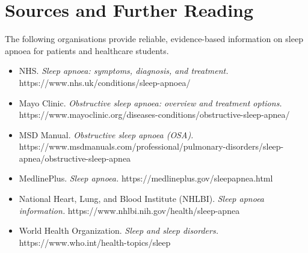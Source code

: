 \section*{Sources and Further Reading}
The following organisations provide reliable, evidence-based information on sleep apnoea for patients and healthcare students.

\begin{itemize}
    \item NHS. \textit{Sleep apnoea: symptoms, diagnosis, and treatment.} https://www.nhs.uk/conditions/sleep-apnoea/
    \item Mayo Clinic. \textit{Obstructive sleep apnoea: overview and treatment options.} https://www.mayoclinic.org/diseases-conditions/obstructive-sleep-apnea/
    \item MSD Manual. \textit{Obstructive sleep apnoea (OSA).} https://www.msdmanuals.com/professional/pulmonary-disorders/sleep-apnea/obstructive-sleep-apnea
    \item MedlinePlus. \textit{Sleep apnoea.} https://medlineplus.gov/sleepapnea.html
    \item National Heart, Lung, and Blood Institute (NHLBI). \textit{Sleep apnoea information.} https://www.nhlbi.nih.gov/health/sleep-apnea
    \item World Health Organization. \textit{Sleep and sleep disorders.} https://www.who.int/health-topics/sleep
\end{itemize}
